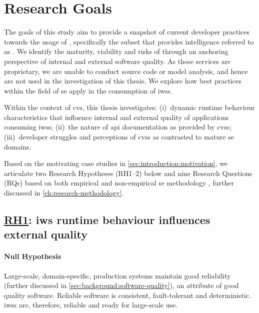 \section{Research Goals}
\label{sec:introduction:hypohtesis}

The goals of this study aim to provide a snapshot of current developer practices towards the usage of , specifically the subset that provides  intelligence referred to as . We identify the maturity, viability and risks of  through an anchoring perspective of internal and external software quality. 
As these services are proprietary, we are unable to conduct source code or model analysis, and hence are not used in the investigation of this thesis.
We explore how best practices within the field of \gls{se} apply in the consumption of \glspl{iws}.

\begin{callout}
Within the context of \gls{cvs}, this thesis investigates: (i)~dynamic runtime behaviour characteristics that influence internal and external quality of applications consuming \glspl{iws}; (ii)~the nature of \gls{api} documentation as provided by \glspl{cvs}; (iii)~developer struggles and perceptions of \glspl{cvs} as contrasted to mature \gls{se} domains.
\end{callout}

Based on the motivating case studies in \cref{sec:introduction:motivation}, we articulate two Research Hypotheses (RH1--2) below and nine Research Questions (RQs) based on  both empirical and non-empirical \gls{se} methodology \citep{Shull:2007vh,Simon:1996uw}, further discussed in \cref{ch:research-methodology}.

\newcommand{\rh}[1]{\hyperref[rh#1]{RH#1}}
\subsection[Research Hypothesis 1]{\underline{RH1}: \gls{iws} runtime behaviour influences external quality}
\label{rh1}

\paragraph{Null Hypothesis}
Large-scale, domain-specific, production systems maintain good reliability (further discussed in \cref{sec:background:software-quality}), an attribute of good quality software. Reliable software is consistent, fault-tolerant and deterministic. \Glspl{iws} are, therefore, reliable and ready for large-scale use.

